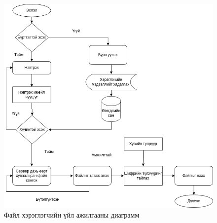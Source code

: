 \begin{figure}[H]
    \centering
    \includegraphics[scale=0.5]{Figures/delegatee.drawio.png}
    \caption[pyUmbral]{Файл хэрэглэгчийн үйл ажилгааны диаграмм}
    \label{fig:delegatee_diagram}
\end{figure}

    

